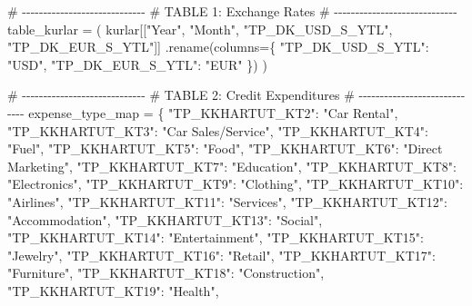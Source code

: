 \documentclass[
  11pt,
  a4paper,
  DIV=11,
  numbers=noendperiod]{scrartcl}
\newenvironment{Shaded}{\begin{snugshade}}{\end{snugshade}}
\newcommand{\CommentTok}[1]{\textcolor[rgb]{0.37,0.37,0.37}{#1}}
\newcommand{\NormalTok}[1]{\textcolor[rgb]{0.00,0.23,0.31}{#1}}
\newcommand{\OperatorTok}[1]{\textcolor[rgb]{0.37,0.37,0.37}{#1}}
\newcommand{\StringTok}[1]{\textcolor[rgb]{0.13,0.47,0.30}{#1}}
\begin{document}
\begin{Shaded}
\begin{Highlighting}[]
\CommentTok{\# {-}{-}{-}{-}{-}{-}{-}{-}{-}{-}{-}{-}{-}{-}{-}{-}{-}{-}{-}{-}{-}{-}{-}{-}{-}{-}{-}{-}{-}}
\CommentTok{\# TABLE 1: Exchange Rates}
\CommentTok{\# {-}{-}{-}{-}{-}{-}{-}{-}{-}{-}{-}{-}{-}{-}{-}{-}{-}{-}{-}{-}{-}{-}{-}{-}{-}{-}{-}{-}{-}}
\NormalTok{table\_kurlar }\OperatorTok{=}\NormalTok{ (}
\NormalTok{    kurlar[[}\StringTok{"Year"}\NormalTok{, }\StringTok{"Month"}\NormalTok{, }\StringTok{"TP\_DK\_USD\_S\_YTL"}\NormalTok{, }\StringTok{"TP\_DK\_EUR\_S\_YTL"}\NormalTok{]]}
\NormalTok{    .rename(columns}\OperatorTok{=}\NormalTok{\{}
        \StringTok{"TP\_DK\_USD\_S\_YTL"}\NormalTok{: }\StringTok{"USD"}\NormalTok{,}
        \StringTok{"TP\_DK\_EUR\_S\_YTL"}\NormalTok{: }\StringTok{"EUR"}
\NormalTok{    \})}
\NormalTok{)}

\CommentTok{\# {-}{-}{-}{-}{-}{-}{-}{-}{-}{-}{-}{-}{-}{-}{-}{-}{-}{-}{-}{-}{-}{-}{-}{-}{-}{-}{-}{-}{-}}
\CommentTok{\# TABLE 2: Credit Expenditures}
\CommentTok{\# {-}{-}{-}{-}{-}{-}{-}{-}{-}{-}{-}{-}{-}{-}{-}{-}{-}{-}{-}{-}{-}{-}{-}{-}{-}{-}{-}{-}{-}}
\NormalTok{expense\_type\_map }\OperatorTok{=}\NormalTok{ \{}
    \StringTok{"TP\_KKHARTUT\_KT2"}\NormalTok{: }\StringTok{"Car Rental"}\NormalTok{,}
    \StringTok{"TP\_KKHARTUT\_KT3"}\NormalTok{: }\StringTok{"Car Sales/Service"}\NormalTok{,}
    \StringTok{"TP\_KKHARTUT\_KT4"}\NormalTok{: }\StringTok{"Fuel"}\NormalTok{,}
    \StringTok{"TP\_KKHARTUT\_KT5"}\NormalTok{: }\StringTok{"Food"}\NormalTok{,}
    \StringTok{"TP\_KKHARTUT\_KT6"}\NormalTok{: }\StringTok{"Direct Marketing"}\NormalTok{,}
    \StringTok{"TP\_KKHARTUT\_KT7"}\NormalTok{: }\StringTok{"Education"}\NormalTok{,}
    \StringTok{"TP\_KKHARTUT\_KT8"}\NormalTok{: }\StringTok{"Electronics"}\NormalTok{,}
    \StringTok{"TP\_KKHARTUT\_KT9"}\NormalTok{: }\StringTok{"Clothing"}\NormalTok{,}
    \StringTok{"TP\_KKHARTUT\_KT10"}\NormalTok{: }\StringTok{"Airlines"}\NormalTok{,}
    \StringTok{"TP\_KKHARTUT\_KT11"}\NormalTok{: }\StringTok{"Services"}\NormalTok{,}
    \StringTok{"TP\_KKHARTUT\_KT12"}\NormalTok{: }\StringTok{"Accommodation"}\NormalTok{,}
    \StringTok{"TP\_KKHARTUT\_KT13"}\NormalTok{: }\StringTok{"Social"}\NormalTok{,}
    \StringTok{"TP\_KKHARTUT\_KT14"}\NormalTok{: }\StringTok{"Entertainment"}\NormalTok{,}
    \StringTok{"TP\_KKHARTUT\_KT15"}\NormalTok{: }\StringTok{"Jewelry"}\NormalTok{,}
    \StringTok{"TP\_KKHARTUT\_KT16"}\NormalTok{: }\StringTok{"Retail"}\NormalTok{,}
    \StringTok{"TP\_KKHARTUT\_KT17"}\NormalTok{: }\StringTok{"Furniture"}\NormalTok{,}
    \StringTok{"TP\_KKHARTUT\_KT18"}\NormalTok{: }\StringTok{"Construction"}\NormalTok{,}
    \StringTok{"TP\_KKHARTUT\_KT19"}\NormalTok{: }\StringTok{"Health"}\NormalTok{,}

\end{Highlighting}
\end{Shaded}
\end{document}

